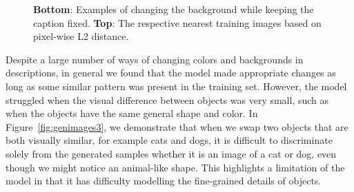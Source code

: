 \documentclass{article} %
\begin{document}
\begin{figure}[!h]
\begin{center}
%
\quad
%
\quad
%
\quad
%
\end{center}
\caption{\textbf{Bottom}: Examples of changing the background while keeping the caption fixed. \textbf{Top}: The respective nearest training images based on pixel-wise L2 distance.}
\label{fig:genimages2}
\vspace{-0.3cm}
\end{figure}

Despite a large number of ways of changing colors and backgrounds in descriptions, in general we found that the model made appropriate changes as long as some similar pattern was present in the training set. However, the model struggled when the visual difference between objects was very small, such as when the objects have the same general shape and color. In Figure~\ref{fig:genimages3}, we demonstrate that when we swap two objects that are both visually similar, for example cats and dogs, it is difficult to discriminate solely from the generated samples whether it is an image of a cat or dog, even though we might notice an animal-like shape. This highlights a limitation of the model in that it has difficulty modelling the fine-grained details of objects. 
 
\end{document}
